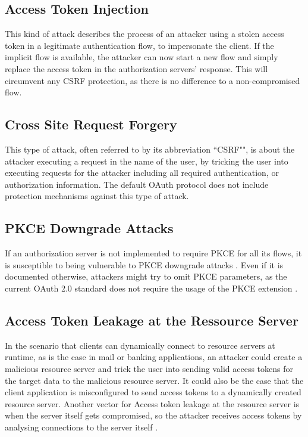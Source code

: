 \documentclass[
    fontsize=12pt,
    headings=small,
    parskip=half,           %
    bibliography=totoc,
    numbers=noenddot,       %
    open=any,               %
    ]{scrreprt}
\begin{document}
\subsection{Access Token Injection}
This kind of attack describes the process of an attacker using a stolen access
token in a legitimate authentication flow, to impersonate the client. If the
implicit flow is available, the attacker can now start a new flow and simply
replace the access token in the authorization servers' response. This will
circumvent any CSRF protection, as there is no difference to a non-compromised
flow. \cite{lodderstedt2020oauth}


\subsection{Cross Site Request Forgery}
\label{subsec:csrf}
This type of attack, often referred to by its abbreviation ``CSRF"", is about
the attacker executing a request in the name of the user, by tricking the user
into executing requests for the attacker including all required authentication,
or authorization information. The default OAuth protocol does not include
protection mechanisms against this type of attack. 

\subsection{PKCE Downgrade Attacks}
If an authorization server is not implemented to require PKCE for all its
flows, it is susceptible to being vulnerable to PKCE downgrade attacks
\cite{philippaerts2022oauch}. Even if it is documented otherwise, attackers
might try to omit PKCE parameters, as the current OAuth 2.0 standard does not
require the usage of the PKCE extension \cite{hardt2012rfc}. 


\subsection{Access Token Leakage at the Ressource Server}
In the scenario that clients can dynamically connect to resource servers at runtime, as is the case in mail or banking applications, an attacker could create a malicious resource server and trick the user into sending valid access tokens for the target data to the malicious resource server. It could also be the case that the client application is misconfigured to send access tokens to a dynamically created resource server. Another vector for Access token leakage at the resource server is when the server itself gets compromised, so the attacker receives access tokens by analysing connections to the server itself \cite{lodderstedt2020oauth}.
\end{document}
